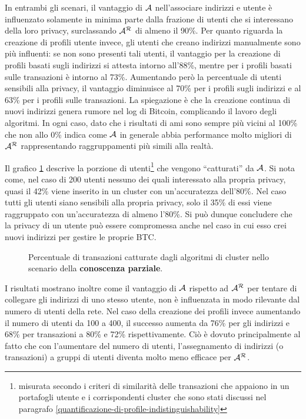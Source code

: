 In entrambi gli scenari, il vantaggio di $\mathcal{A}$ nell'associare indirizzi e utente è influenzato solamente in minima parte dalla frazione di utenti che si interessano della loro privacy, surclassando $\mathcal{A}^\mathcal{R}$ di almeno il 90\%.
Per quanto riguarda la creazione di profili utente invece, gli utenti che creano indirizzi manualmente sono più influenti: se non sono presenti tali utenti, il vantaggio per la creazione di profili basati sugli indirizzi si attesta intorno all'88\%, mentre per i profili basati sulle transazioni è intorno al 73\%. Aumentando però la percentuale di utenti sensibili alla privacy, il vantaggio diminuisce al 70\% per i profili sugli indirizzi e al 63\% per i profili sulle transazioni.
La spiegazione è che la creazione continua di nuovi indirizzi genera rumore nel log di Bitcoin, complicando il lavoro degli algoritmi. In ogni caso, dato che i risultati di \gls{ami} sono sempre più vicini al 100\% che non allo 0\% indica come $\mathcal{A}$ in generale abbia performance molto migliori di $\mathcal{A}^\mathcal{R}$ rappresentando raggruppamenti più simili alla realtà.

Il grafico \ref{userprivacy_fig_2} descrive la porzione di utenti\footnote{misurata secondo i criteri di similarità delle transazioni che appaiono in un portafogli utente e i corrispondenti cluster che sono stati discussi nel paragrafo \ref{quantificazione-di-profile-indistinguishability}} che vengono ``catturati'' da $\mathcal{A}$. Si nota come, nel caso di 200 utenti nessuno dei quali interessato alla propria privacy, quasi il 42\%  viene inserito  in un cluster con un'accuratezza dell'80\%. Nel caso tutti gli utenti siano sensibili alla propria privacy, solo il 35\% di essi viene raggruppato con un'accuratezza di almeno l'80\%. Si può dunque concludere che la privacy di un utente può essere compromessa anche nel caso in cui esso crei nuovi indirizzi per gestire le proprie BTC.

\begin{figure}[htbp]
\centering
\caption{Percentuale di transazioni catturate dagli algoritmi di cluster nello scenario della \textbf{conoscenza parziale}.\label{userprivacy_fig_2}}
\end{figure}

I risultati mostrano inoltre come il vantaggio di $\mathcal{A}$ rispetto ad $\mathcal{A}^\mathcal{R}$ per tentare di collegare gli indirizzi di uno stesso utente, non è influenzata in modo rilevante dal numero di utenti della rete.
Nel caso della creazione dei profili invece aumentando il numero di utenti da 100 a 400, il successo aumenta da 76\% per gli indirizzi e 68\% per transazioni a 80\% e 72\% rispettivamente. Ciò è dovuto principalmente al fatto che con l'aumentare del numero di utenti, l'assegnamento di indirizzi (o transazioni) a gruppi di utenti diventa molto meno efficace per $\mathcal{A}^\mathcal{R}$.

